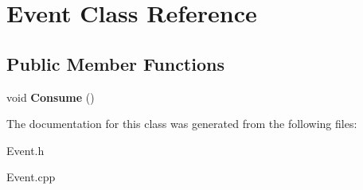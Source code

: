 \hypertarget{class_event}{}\section{Event Class Reference}
\label{class_event}
\subsection*{Public Member Functions}
\begin{DoxyCompactItemize}
\item 
\mbox{\label{class_event_abbeb25225e4497bfa784127f0a639456}} 
void {\bfseries Consume} ()
\end{DoxyCompactItemize}


The documentation for this class was generated from the following files\+:\begin{DoxyCompactItemize}
\item 
Event.\+h\item 
Event.\+cpp\end{DoxyCompactItemize}
